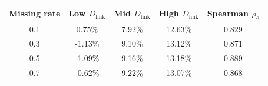 \begin{tabular}{@{}c c c c c@{}}
\toprule
Missing rate & Low $D_{\mathrm{link}}$ & Mid $D_{\mathrm{link}}$ & High $D_{\mathrm{link}}$ & Spearman $\rho_s$\\
\midrule
0.1 & 0.75\% & 7.92\% & 12.63\% & 0.829\\
0.3 & -1.13\% & 9.10\% & 13.12\% & 0.871\\
0.5 & -1.09\% & 9.16\% & 13.18\% & 0.889\\
0.7 & -0.62\% & 9.22\% & 13.07\% & 0.868\\
\bottomrule
\end{tabular}
